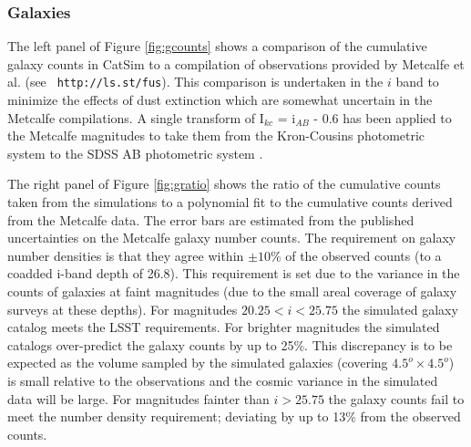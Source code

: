 \documentclass[11pt]{article}
\begin{document}
\subsubsection{Galaxies \label{sec:galaxycounts}}

The left panel of Figure \ref{fig:gcounts} shows a comparison of the
cumulative galaxy counts in CatSim to a compilation of observations
provided by Metcalfe et al. (see {\tt
  http://ls.st/fus}).  This
comparison is undertaken in the $i$ band to minimize the effects of
dust extinction which are somewhat uncertain in the Metcalfe
compilations.  A single transform of I$_{kc}$ = i$_{AB}$ - 0.6 has
been applied to the Metcalfe magnitudes to take them from the
Kron-Cousins photometric system to the SDSS AB photometric system \citep{ellis07}.

The right panel of Figure \ref{fig:gratio} shows the ratio of the
cumulative counts taken from the simulations to a polynomial fit to
the cumulative counts derived from the Metcalfe data.  The error bars
are estimated from the published uncertainties on the Metcalfe galaxy
number counts. The requirement on galaxy number densities is that they
agree within $\pm10\%$ of the observed counts (to a coadded i-band
depth of 26.8). This requirement is set due to the variance in the
counts of galaxies at faint magnitudes (due to the small areal
coverage of galaxy surveys at these depths).  For magnitudes
$20.25<i<25.75$ the simulated galaxy catalog meets the LSST
requirements.  For brighter magnitudes the simulated catalogs
over-predict the galaxy counts by up to 25\%. This discrepancy is to be
expected as the volume sampled by the simulated galaxies (covering
$4.5^o \times 4.5^o$) is small relative to the observations and the
cosmic variance in the simulated data will be large. For magnitudes
fainter than $i>25.75$ the galaxy counts fail to meet the number
density requirement; deviating by up to 13\% from the observed counts.

\end{document}
